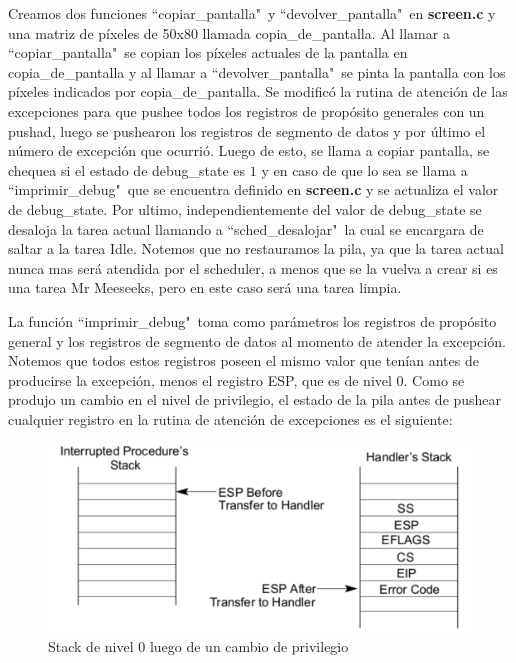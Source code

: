 \documentclass[a4paper]{article}
\begin{document}
\justify
Creamos dos funciones ``copiar_pantalla"\ y ``devolver_pantalla"\ en \textbf{screen.c} y una matriz de píxeles de 50x80 llamada copia_de_pantalla. Al llamar a ``copiar_pantalla"\ se copian los píxeles actuales de la pantalla en copia_de_pantalla y al llamar a ``devolver_pantalla"\ se pinta la pantalla con los píxeles indicados por copia_de_pantalla.
\justify
Se modificó la rutina de atención de las excepciones para que pushee todos los registros de propósito generales con un pushad, luego se pushearon los registros de segmento de datos y por último el número de excepción que ocurrió. Luego de esto, se llama a copiar pantalla, se chequea si el estado de debug_state es $1$ y en caso de que lo sea se llama a ``imprimir_debug"\ que se encuentra definido en \textbf{screen.c} y se actualiza el valor de debug\_state. Por ultimo, independientemente del valor de debug_state se desaloja la tarea actual llamando a ``sched_desalojar"\, la cual se encargara de saltar a la tarea Idle. Notemos que no restauramos la pila, ya que la tarea actual nunca mas será atendida por el scheduler, a menos que se la vuelva a crear si es una tarea Mr Meeseeks, pero en este caso será una tarea limpia.

\justify
La función ``imprimir_debug"\ toma como parámetros los registros de propósito general y los registros de segmento de datos al momento de atender la excepción. Notemos que todos estos registros poseen el mismo valor que tenían antes de producirse la excepción, menos el registro ESP, que es de nivel 0. Como se produjo un cambio en el nivel de privilegio, el estado de la pila antes de pushear cualquier registro en la rutina de atención de excepciones es el siguiente:

\begin{figure}[h]
	\centering
	\includegraphics[scale=0.6]{img/pilaCambioPrivilegioManual.pdf}
	\caption{Stack de nivel 0 luego de un cambio de privilegio}
	\label{fig:cambio_privilegio}
\end{figure}
\end{document}
